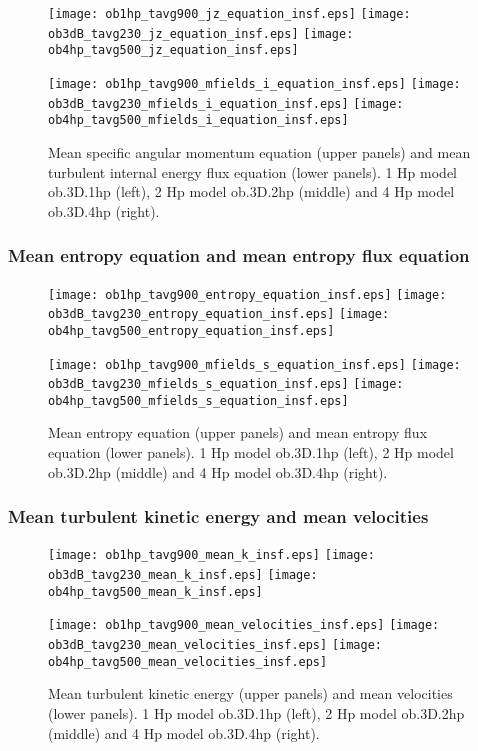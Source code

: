 \documentclass[10pt,paper=a4]{report}
\begin{document}
\begin{figure}[!h]
\centerline{
\texttt{[image: ob1hp\_tavg900\_jz\_equation\_insf.eps]}
\texttt{[image: ob3dB\_tavg230\_jz\_equation\_insf.eps]}
\texttt{[image: ob4hp\_tavg500\_jz\_equation\_insf.eps]}}

\centerline{
\texttt{[image: ob1hp\_tavg900\_mfields\_i\_equation\_insf.eps]}
\texttt{[image: ob3dB\_tavg230\_mfields\_i\_equation\_insf.eps]}
\texttt{[image: ob4hp\_tavg500\_mfields\_i\_equation\_insf.eps]}}
\caption{Mean specific angular momentum equation (upper panels) and mean turbulent internal energy flux equation (lower panels). 1 Hp model {\sf ob.3D.1hp} (left), 2 Hp model {\sf ob.3D.2hp} (middle) and 4 Hp model {\sf ob.3D.4hp} (right).}
\end{figure}

\newpage

\subsubsection{Mean entropy equation and mean entropy flux equation}

\begin{figure}[!h]
\centerline{
\texttt{[image: ob1hp\_tavg900\_entropy\_equation\_insf.eps]}
\texttt{[image: ob3dB\_tavg230\_entropy\_equation\_insf.eps]}
\texttt{[image: ob4hp\_tavg500\_entropy\_equation\_insf.eps]}}

\centerline{
\texttt{[image: ob1hp\_tavg900\_mfields\_s\_equation\_insf.eps]}
\texttt{[image: ob3dB\_tavg230\_mfields\_s\_equation\_insf.eps]}
\texttt{[image: ob4hp\_tavg500\_mfields\_s\_equation\_insf.eps]}}
\caption{Mean entropy equation (upper panels) and mean entropy flux equation (lower panels). 1 Hp model {\sf ob.3D.1hp} (left), 2 Hp model {\sf ob.3D.2hp} (middle) and 4 Hp model {\sf ob.3D.4hp} (right).}
\end{figure}

\newpage

\subsubsection{Mean turbulent kinetic energy and mean velocities}

\begin{figure}[!h]
\centerline{
\texttt{[image: ob1hp\_tavg900\_mean\_k\_insf.eps]}
\texttt{[image: ob3dB\_tavg230\_mean\_k\_insf.eps]}
\texttt{[image: ob4hp\_tavg500\_mean\_k\_insf.eps]}}

\centerline{
\texttt{[image: ob1hp\_tavg900\_mean\_velocities\_insf.eps]}
\texttt{[image: ob3dB\_tavg230\_mean\_velocities\_insf.eps]}
\texttt{[image: ob4hp\_tavg500\_mean\_velocities\_insf.eps]}}
\caption{Mean turbulent kinetic energy (upper panels) and mean velocities (lower panels). 1 Hp model {\sf ob.3D.1hp} (left), 2 Hp model {\sf ob.3D.2hp} (middle) and 4 Hp model {\sf ob.3D.4hp} (right).}
\end{figure}
\end{document}
